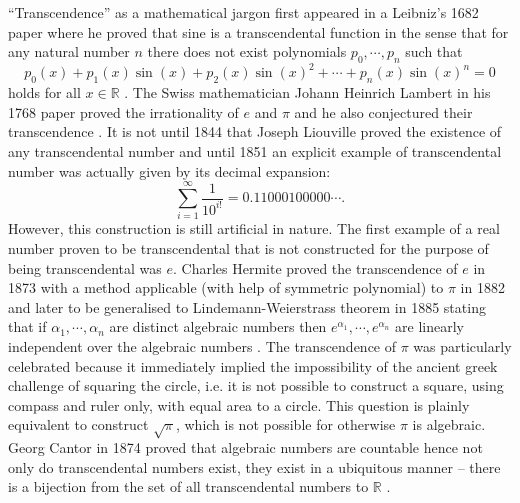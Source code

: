 \documentclass{report}
\theoremstyle{definition}
\begin{document}
``Transcendence'' as a mathematical jargon first appeared in a Leibniz's 1682 paper where he proved that sine is a transcendental function in the sense that for any natural number $n$ there does not exist polynomials $p_0,\cdots,p_n$ such that
$$p_0(x)+p_1(x)\sin(x)+p_2(x)\sin(x)^2+\cdots+p_n(x)\sin(x)^n=0$$
holds for all $x\in\mathbb R$ \cite{bourbaki1998elements}. The Swiss mathematician Johann Heinrich Lambert in his 1768 paper proved the irrationality of $e$ and $\pi$ and he also conjectured their transcendence \cite{lambert2004memoire}. It is not until 1844 that Joseph Liouville proved the existence of any transcendental number and until 1851 an explicit example of transcendental number was actually given by its decimal expansion:\cite{10.2307/1988833}
$$\sum_{i=1}^\infty\frac1{10^{i!}}=0.11000100000\cdots.$$
However, this construction is still artificial in nature. The first example of a real number proven to be transcendental that is not constructed for the purpose of being transcendental was $e$. Charles Hermite proved the transcendence of $e$ in 1873 with a method applicable (with help of symmetric polynomial) to $\pi$ in 1882 and later to be generalised to Lindemann-Weierstrass theorem in 1885 stating that if $\alpha_1,\cdots, \alpha_n$ are distinct algebraic numbers then $e^{\alpha_1},\cdots,e^{\alpha_n}$ are linearly independent over the algebraic numbers \cite{baker1990transcendental}. The transcendence of $\pi$ was particularly celebrated because it immediately implied the impossibility of the ancient greek challenge of squaring the circle, i.e. it is not possible to construct a square, using compass and ruler only, with equal area to a circle. This question is plainly equivalent to construct $\sqrt\pi$, which is not possible for otherwise $\pi$ is algebraic. Georg Cantor in 1874 proved that algebraic numbers are countable hence not only do transcendental numbers exist, they exist in a ubiquitous manner -- there is a bijection from the set of all transcendental numbers to $\mathbb R$ \cite{cantor1932uber,cantor1878beitrag}.
\end{document}
